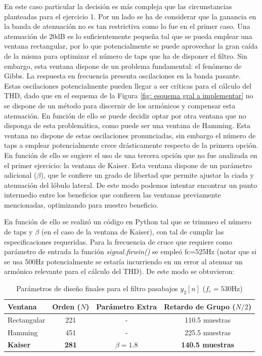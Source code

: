 En este caso particular la decisión es más compleja que las circunstancias planteadas para el ejercicio 1. Por un lado se ha de considerar que la ganancia en la banda de atenuación no es tan restrictiva como lo fue en el primer caso. Una atenuación de 20dB es lo suficientemente pequeña tal que se pueda emplear una ventana rectangular, por lo que potencialmente se puede aprovechar la gran caída de la misma para optimizar el número de taps que ha de disponer el filtro. Sin embargo, esta ventana dispone de un problema fundamental: el fenómeno de Gibbs. La respuesta en frecuencia presenta oscilaciones en la banda pasante. Estas oscilaciones potencialmente pueden llegar a ser críticas para el cálculo del THD, dado que en el esquema de la Figura \ref{fig: esquema gral a implementar} no se dispone de un método para discernir de los armónicos y compensar esta atenuación. En función de ello se puede decidir optar por otra ventana que no disponga de esta problemática, como puede ser una ventana de Hamming. Esta ventana no dispone de estas oscilaciones pronunciadas, sin embargo el número de taps a emplear potencialmente crece drásticamente respecto de la primera opción. En función de ello se sugiere el uso de una tercera opción que no fue analizada en el primer ejercicio: la ventana de Kaiser. Esta ventana dispone de un parámetro adicional ($\beta$), que le confiere un grado de libertad que permite ajustar la ciada y atenuación del lóbulo lateral. De este modo podemos intentar encontrar un punto intermedio entre los beneficios que confieren las ventanas previamente mencionadas, optimizando para nuestro beneficio.

En función de ello se realizó un código en Python tal que se trimmeo el número de taps y $\beta$ (en el caso de la ventana de Kaiser), con tal de cumplir las especificaciones requeridas. Para la frecuencia de cruce que requiere como parámetro de entrada la función \emph{signal.firwin()} se empleó fc=525Hz (notar que si se usa 500Hz potencialmente se estaría incurriendo en un error al atenuar un armónico relevante para el cálculo del THD). De este modo se obtuvieron:

\begin{table}[H]
\centering
\caption{Parámetros de diseño finales para el filtro pasabajos $y_2[n]$ ($f_c = 530\text{Hz}$)}
\begin{tabular}{lccc}
\toprule
\textbf{Ventana} & \textbf{Orden ($N$)} & \textbf{Parámetro Extra} & \textbf{Retardo de Grupo ($N/2$)} \\
\midrule
Rectangular & 221 & - & 110.5 muestras \\
Hamming     & 451 & - & 225.5 muestras \\
\textbf{Kaiser} & \textbf{281} & \boldmath$\beta = 1.8$ & \textbf{140.5 muestras} \\
\bottomrule
\end{tabular}
\label{tab:diseno_final_taps}
\end{table}


